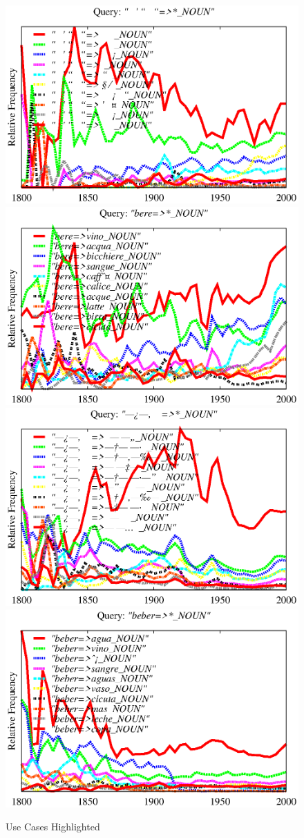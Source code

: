 \documentclass[11pt]{article}
\begin{document}
\begin{figure}
{\includegraphics[width=.48\textwidth]{graphs/drink_HEB}
\includegraphics[width=.48\textwidth]{graphs/drink_ITA}
\includegraphics[width=.48\textwidth]{graphs/drink_RUS}
\includegraphics[width=.48\textwidth]{graphs/drink_SPA}}
\caption{\label{fig:examples}
Use Cases Highlighted}
\end{figure}
\end{document}
